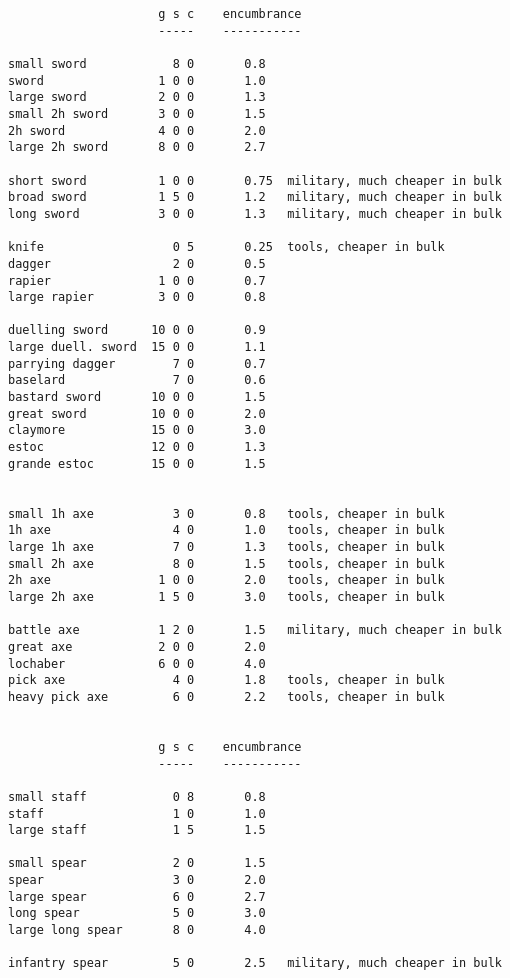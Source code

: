 \begin{verbatim}
                     g s c    encumbrance
                     -----    -----------

small sword            8 0       0.8
sword                1 0 0       1.0
large sword          2 0 0       1.3
small 2h sword       3 0 0       1.5
2h sword             4 0 0       2.0
large 2h sword       8 0 0       2.7

short sword          1 0 0       0.75  military, much cheaper in bulk
broad sword          1 5 0       1.2   military, much cheaper in bulk
long sword           3 0 0       1.3   military, much cheaper in bulk

knife                  0 5       0.25  tools, cheaper in bulk
dagger                 2 0       0.5
rapier               1 0 0       0.7
large rapier         3 0 0       0.8

duelling sword      10 0 0       0.9
large duell. sword  15 0 0       1.1
parrying dagger        7 0       0.7
baselard               7 0       0.6
bastard sword       10 0 0       1.5
great sword         10 0 0       2.0
claymore            15 0 0       3.0
estoc               12 0 0       1.3
grande estoc        15 0 0       1.5


small 1h axe           3 0       0.8   tools, cheaper in bulk
1h axe                 4 0       1.0   tools, cheaper in bulk
large 1h axe           7 0       1.3   tools, cheaper in bulk
small 2h axe           8 0       1.5   tools, cheaper in bulk
2h axe               1 0 0       2.0   tools, cheaper in bulk
large 2h axe         1 5 0       3.0   tools, cheaper in bulk

battle axe           1 2 0       1.5   military, much cheaper in bulk
great axe            2 0 0       2.0
lochaber             6 0 0       4.0
pick axe               4 0       1.8   tools, cheaper in bulk
heavy pick axe         6 0       2.2   tools, cheaper in bulk


                     g s c    encumbrance
                     -----    -----------

small staff            0 8       0.8
staff                  1 0       1.0
large staff            1 5       1.5

small spear            2 0       1.5
spear                  3 0       2.0
large spear            6 0       2.7
long spear             5 0       3.0
large long spear       8 0       4.0

infantry spear         5 0       2.5   military, much cheaper in bulk


\end{verbatim}
